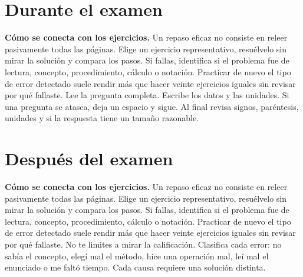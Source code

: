 \documentclass[10pt,oneside,openany]{book}
\begin{document}
\section{Durante el examen}

\textbf{Cómo se conecta con los ejercicios.} Un repaso eficaz no consiste en releer pasivamente todas las páginas. Elige un ejercicio representativo, resuélvelo sin mirar la solución y compara los pasos. Si fallas, identifica si el problema fue de lectura, concepto, procedimiento, cálculo o notación. Practicar de nuevo el tipo de error detectado suele rendir más que hacer veinte ejercicios iguales sin revisar por qué fallaste.
Lee la pregunta completa. Escribe los datos y las unidades. Si una pregunta se atasca, deja un espacio y sigue. Al final revisa signos, paréntesis, unidades y si la respuesta tiene un tamaño razonable.

\section{Después del examen}

\textbf{Cómo se conecta con los ejercicios.} Un repaso eficaz no consiste en releer pasivamente todas las páginas. Elige un ejercicio representativo, resuélvelo sin mirar la solución y compara los pasos. Si fallas, identifica si el problema fue de lectura, concepto, procedimiento, cálculo o notación. Practicar de nuevo el tipo de error detectado suele rendir más que hacer veinte ejercicios iguales sin revisar por qué fallaste.
No te limites a mirar la calificación. Clasifica cada error: no sabía el concepto, elegí mal el método, hice una operación mal, leí mal el enunciado o me faltó tiempo. Cada causa requiere una solución distinta.
\end{document}
